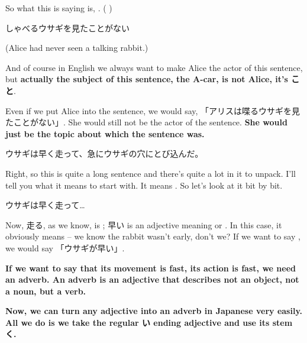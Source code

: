 {}

So what this is saying is, . ( )

\startblockquote
しゃべるウサギを見たことがない
\stopblockquote

(Alice had never seen a talking rabbit.)

And of course in English we always want to make Alice the actor of this sentence, but {\bf actually the subject of this sentence, the A-car, is not Alice, it's こと}.

{}

Even if we put Alice into the sentence, we would say, 「アリスは喋るウサギを見たことがない」. She would still not be the actor of the sentence. {\bf She would just be the topic about which the sentence was.} 

{}

\thinrule

ウサギは早く走って、急にウサギの穴にとび込んだ。

{}

Right, so this is quite a long sentence and there's quite a lot in it to unpack. I'll tell you what it means to start with. It means . So let's look at it bit by bit.

\startblockquote
ウサギは早く走って\ldots{}
\stopblockquote

Now, 走る, as we know, is ; 早い is an adjective meaning  or . In this case, it obviously means  -- we know the rabbit wasn't early, don't we? If we want to say , we would say 「ウサギが早い」.

\stopsectionlevel

\startsectionlevel[title={Adverbs},reference={adverbs}]

{\bf If we want to say that its movement is fast, its action is fast, we need an adverb. An adverb is an adjective that describes not an object, not a noun, but a verb.}

\thinrule

{\bf Now, we can turn any adjective into an adverb in Japanese very easily.} {\bf All we do is we take the regular い ending adjective and use its stem く.}

